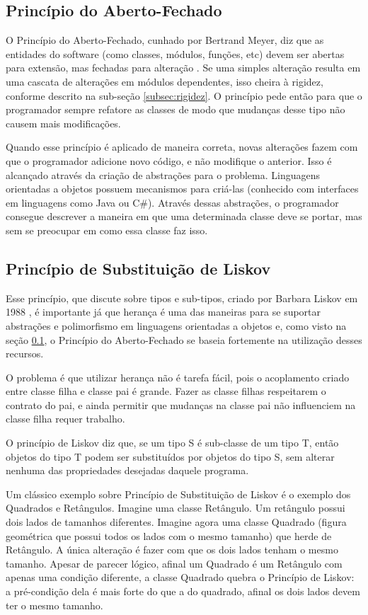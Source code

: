 \subsection{Princípio do Aberto-Fechado}
\label{subsec:ocp}

O Princípio do Aberto-Fechado, cunhado por Bertrand Meyer, diz que as entidades
do software (como classes, módulos, funções, etc) devem ser abertas para
extensão, mas fechadas para alteração \cite{meyer-ocp}. 
Se uma simples alteração resulta em uma cascata de alterações em módulos
dependentes, isso cheira à rigidez, conforme descrito na sub-seção 
\ref{subsec:rigidez}. O princípio pede então para que o programador sempre 
refatore as classes de modo que mudanças desse tipo não causem mais modificações.

Quando esse princípio é aplicado de maneira correta, novas alterações fazem com
que o programador adicione novo código, e não modifique o anterior. Isso é
alcançado através da criação de abstrações para o problema. Linguagens
orientadas a objetos possuem mecanismos para criá-las (conhecido com interfaces
em linguagens como Java ou C\#). Através dessas abstrações, o programador consegue 
descrever a maneira em que uma determinada classe deve se portar, mas sem se
preocupar em como essa classe faz isso.

\subsection{Princípio de Substituição de Liskov}
\label{subsec:lsp}

Esse princípio, que discute sobre tipos e sub-tipos, criado por Barbara Liskov
em 1988 \cite{liskov}, é importante já que herança é uma das maneiras para se 
suportar abstrações e polimorfismo em linguagens orientadas a objetos e, como 
visto na seção \ref{subsec:ocp}, o Princípio do Aberto-Fechado se baseia 
fortemente na utilização desses recursos.

O problema é que utilizar herança não é tarefa fácil, pois o acoplamento criado
entre classe filha e classe pai é grande. Fazer as classe filhas respeitarem o
contrato do pai, e ainda permitir que mudanças na classe pai não influenciem na
classe filha requer trabalho.

O princípio de Liskov diz que, se um tipo S é sub-classe de um tipo T,
então objetos do tipo T podem ser substituídos por objetos do tipo S, sem
alterar nenhuma das propriedades desejadas daquele programa.

Um clássico exemplo sobre Princípio de Substituição de Liskov é o exemplo dos
Quadrados e Retângulos. Imagine uma classe Retângulo. Um retângulo possui dois 
lados de tamanhos diferentes. Imagine agora uma classe Quadrado (figura
geométrica que possui todos os lados com o mesmo tamanho) que herde de
Retângulo. A única alteração é fazer com que os dois lados tenham o mesmo 
tamanho. 
Apesar de parecer lógico, afinal um Quadrado é um Retângulo com apenas uma
condição diferente, a classe Quadrado quebra o Princípio de Liskov: a
pré-condição dela é mais forte do que a do quadrado, afinal os dois lados devem 
ter o mesmo tamanho.

